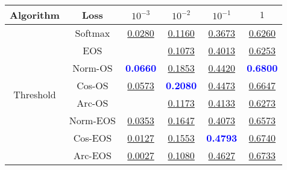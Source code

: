 \begin{table}[t]
\centering
\begin{tabularx}{.7\textwidth}{c|c|cccc}
\bf Algorithm & \bf Loss & $10^{-3}$ & $10^{-2}$ & $10^{-1}$ & $1$\\\hline\hline
\multirow{8}{*}{Threshold} & Softmax & \underline{0.0280} & \underline{0.1160} & \underline{0.3673} & \underline{0.6260}\\
 & EOS & & \underline{0.1073} & \underline{0.4013} & \underline{0.6253}\\
 & Norm-OS & \textcolor{blue}{\bf 0.0660} & \underline{0.1853} & \underline{0.4420} & \textcolor{blue}{\bf 0.6800}\\
 & Cos-OS & \underline{0.0573} & \textcolor{blue}{\bf 0.2080} & \underline{0.4473} & \underline{0.6647}\\
 & Arc-OS & & \underline{0.1173} & \underline{0.4133} & \underline{0.6273}\\
 & Norm-EOS & \underline{0.0353} & \underline{0.1647} & \underline{0.4073} & \underline{0.6573}\\
 & Cos-EOS & \underline{0.0127} & \underline{0.1553} & \textcolor{blue}{\bf 0.4793} & \underline{0.6740}\\
 & Arc-EOS & \underline{0.0027} & \underline{0.1080} & \underline{0.4627} & \underline{0.6733}\\
\hline
\end{tabularx}
\end{table}